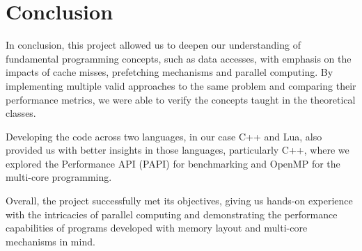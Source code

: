 \section{Conclusion} \label{section:conclusion}

In conclusion, this project allowed us to deepen our understanding of fundamental programming concepts, such as data accesses, with emphasis on the impacts of cache misses, prefetching mechanisms and parallel computing. By implementing multiple valid approaches to the same problem and comparing their performance metrics, we were able to verify the concepts taught in the theoretical classes.

Developing the code across two languages, in our case C++ and Lua, also provided us with better insights in those languages, particularly C++, where we explored the Performance API (PAPI) for benchmarking and OpenMP for the multi-core programming. 

Overall, the project successfully met its objectives, giving us hands-on experience with the intricacies of parallel computing and demonstrating the performance capabilities of programs developed with memory layout and multi-core mechanisms in mind.

